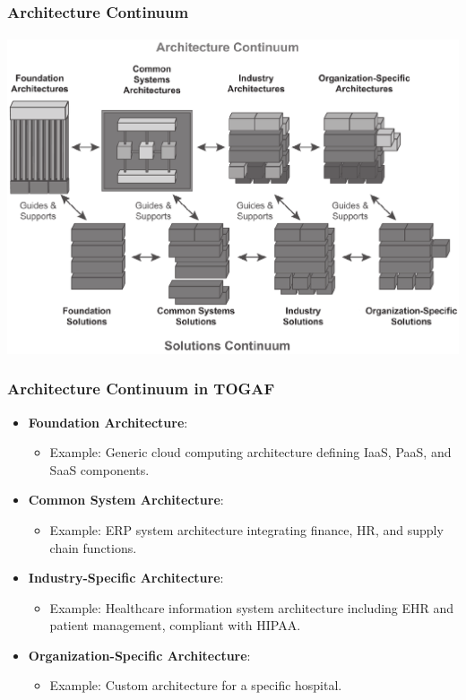 \documentclass[aspectratio=169, table]{beamer}
\begin{document}
	{
		\begin{frame}
			\frametitle{Architecture Continuum}
			\framesubtitle{\hspace{1cm}}
			\begin{center}
				\includegraphics[width=.80\textwidth]{../figures/enterprise_continuum}
			\end{center}
		\end{frame}
	}
	
	\begin{frame}
		\frametitle{Architecture Continuum in TOGAF}
		\vspace{10pt}
		\begin{itemize}
			\item \textbf{Foundation Architecture}: 
			\begin{itemize}
				\item Example: Generic cloud computing architecture defining IaaS, PaaS, and SaaS components.
			\end{itemize}
			\item \textbf{Common System Architecture}: 
			\begin{itemize}
				\item Example: ERP system architecture integrating finance, HR, and supply chain functions.
			\end{itemize}
			\item \textbf{Industry-Specific Architecture}: 
			\begin{itemize}
				\item Example: Healthcare information system architecture including EHR and patient management, compliant with HIPAA.
			\end{itemize}
			\item \textbf{Organization-Specific Architecture}: 
			\begin{itemize}
				\item Example: Custom architecture for a specific hospital.
			\end{itemize}
		\end{itemize}
	\end{frame}
	
\end{document}

